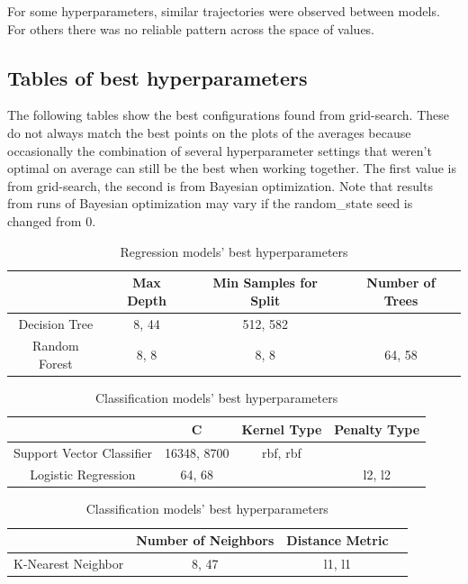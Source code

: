 \documentclass[12pt, letterpaper]{article}
\begin{document}
For some hyperparameters, similar trajectories were observed between models. For others there was no reliable pattern across the space of values.

\subsection{Tables of best hyperparameters}

The following tables show the best configurations found from grid-search. These do not always match the best points on the plots of the averages because occasionally the combination of several hyperparameter settings that weren't optimal on average can still be the best when working together. The first value is from grid-search, the second is from Bayesian optimization. Note that results from runs of Bayesian optimization may vary if the random\_state seed is changed from 0.

\begin{table}[H]
\centering
\caption{Regression models' best hyperparameters}
\label{reg_table}
\begin{tabular}{c|c|c|c} %
                & Max Depth     & Min Samples for Split & Number of Trees \\ \hline
Decision Tree   & 8, 44            & 512, 582                  &   \\
Random Forest   & 8, 8             & 8, 8                    & 64, 58 \\
\end{tabular}
\end{table}

\begin{table}[H]
\centering
\caption{Classification models' best hyperparameters}
\label{cls_table 1}
\begin{tabular}{c|c|c|c} %
                            & C         & Kernel Type   & Penalty Type \\ \hline
Support Vector Classifier   & 16348, 8700     & rbf, rbf \\
Logistic Regression         & 64, 68        &               & l2, l2 \\
\end{tabular}
\end{table}

\begin{table}[H]
\centering
\caption{Classification models' best hyperparameters}
\label{cls_table 2}
\begin{tabular}{c|c|c|c} %
                & Number of Neighbors & Distance Metric\\ \hline
K-Nearest Neighbor & 8, 47 & l1, l1 \\
\end{tabular}
\end{table}
\end{document}
